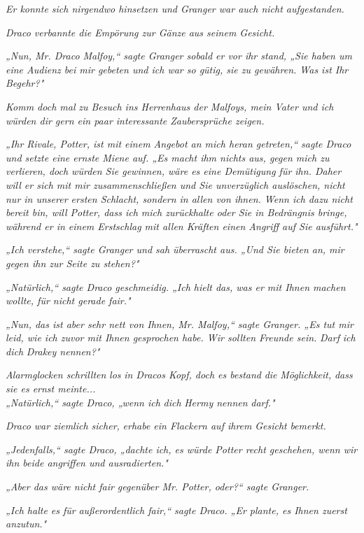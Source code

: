 {\emph{Er konnte sich nirgendwo hinsetzen und Granger war auch nicht aufgestanden.}

\emph{Draco verbannte die Empörung zur Gänze aus seinem Gesicht.}

\emph{„Nun, Mr. Draco Malfoy,“ sagte Granger sobald er vor ihr stand, „Sie haben um eine Audienz bei mir gebeten und ich war so gütig, sie zu gewähren. Was ist Ihr Begehr?"}

\emph{\emph{Komm doch m}\emph{al}} \emph{\emph{zu Besuch ins Herrenhaus der Malfoys, mein Vater und ich würden dir gern ein paar interessante Zaubersprüche zeigen.}}

\emph{„Ihr Rivale, Potter, ist mit einem Angebot an mich heran getreten,“ sagte Draco und setzte eine ernste Miene auf. „Es macht ihm nichts aus, gegen mich zu verlieren, doch würden Sie gewinnen, wäre es eine Demütigung für ihn. Daher will er sich mit mir zusammenschließen und Sie unverzüglich auslöschen, nicht nur in unserer ersten Schlacht, sondern in allen von ihnen. Wenn ich dazu nicht bereit bin, will Potter, dass ich mich zurückhalte oder Sie in Bedrängnis bringe, während er in einem Erstschlag mit allen Kräften einen Angriff auf Sie ausführt."}

\emph{„Ich verstehe,“ sagte Granger und sah überrascht aus. „Und Sie bieten an, mir gegen ihn zur Seite zu stehen?"}

\emph{„Natürlich,“ sagte Draco geschmeidig. „Ich hielt das, was er mit Ihnen machen wollte, für nicht gerade fair."}

\emph{„Nun, das ist aber sehr nett von Ihnen, Mr. Malfoy,“ sagte Granger. „Es tut mir leid, wie ich zuvor mit Ihnen gesprochen habe. Wir sollten Freunde sein.} \emph{Darf} \emph{ich} \emph{dich} \emph{Drakey nennen?"}

\emph{Alarmglocken schrillten} \emph{los} \emph{in Dracos Kopf, doch es bestand} \emph{die} \emph{\emph{Möglichkeit,}} \emph{dass sie es ernst meinte...}\\ \emph{„Natürlich,“ sagte Draco, „wenn ich} \emph{dich} \emph{Hermy nennen} \emph{darf."}

\emph{Draco war ziemlich sicher,} \emph{erhabe ein Flackern auf ihrem} \emph{Gesicht} \emph{bemerkt.}

\emph{„Jedenfalls,“ sagte Draco, „dachte ich, es würde Potter recht geschehen, wenn wir ihn beide angriffen und ausradierten."}

\emph{„Aber das wäre nicht fair gegenüber Mr. Potter, oder?“ sagte Granger.}

\emph{„Ich halte es für} \emph{außerordentlich fair,“ sagte Draco. „Er plante, es Ihnen zuerst anzutun."}

}
